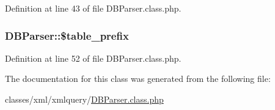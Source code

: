 Definition at line 43 of file D\+B\+Parser.\+class.\+php.

\hypertarget{classDBParser_aecad815ff642d9c918e97747d638dbf0}{
\subsubsection[{\$table\+\_\+prefix}]{\setlength{\rightskip}{0pt plus 5cm}D\+B\+Parser\+::\$table\+\_\+prefix}}\label{classDBParser_aecad815ff642d9c918e97747d638dbf0}


Definition at line 52 of file D\+B\+Parser.\+class.\+php.



The documentation for this class was generated from the following file\+:\begin{DoxyCompactItemize}
\item 
classes/xml/xmlquery/\hyperlink{DBParser_8class_8php}{D\+B\+Parser.\+class.\+php}\end{DoxyCompactItemize}
